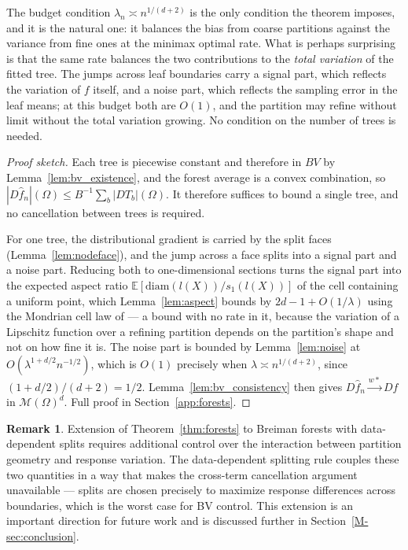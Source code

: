 \documentclass[12pt,a4paper]{article}
\numberwithin{equation}{section}
\theoremstyle{plain}
\theoremstyle{definition}
\newtheorem{remark}{Remark}
\newcommand{\E}{\mathbb{E}}
\newcommand{\cM}{\mathcal{M}(\Omega)^d}
\newcommand{\fn}{\hat{f}_n}
\begin{document}
	The budget condition $\lambda_n \asymp n^{1/(d+2)}$ is the only condition the
	theorem imposes, and it is the natural one: it balances the bias from coarse
	partitions against the variance from fine ones at the minimax optimal rate.
	What is perhaps surprising is that the same rate balances the two
	contributions to the \emph{total variation} of the fitted tree. The jumps
	across leaf boundaries carry a signal part, which reflects the variation of
	$f$ itself, and a noise part, which reflects the sampling error in the leaf
	means; at this budget both are $O(1)$, and the partition may refine without
	limit without the total variation growing. No condition on the number of
	trees is needed.
	
	\begin{proof}[Proof sketch]
		Each tree is piecewise constant and therefore in $BV$ by
		Lemma~\ref{lem:bv_existence}, and the forest average is a convex
		combination, so $|D\fn|(\Omega) \leq B^{-1}\sum_b |DT_b|(\Omega)$. It
		therefore suffices to bound a single tree, and no cancellation between
		trees is required.

		For one tree, the distributional gradient is carried by the split faces
		(Lemma~\ref{lem:nodeface}), and the jump across a face splits into a
		signal part and a noise part. Reducing both to one-dimensional sections
		turns the signal part into the expected aspect ratio
		$\E[\mathrm{diam}(l(X))/s_1(l(X))]$ of the cell containing a uniform
		point, which Lemma~\ref{lem:aspect} bounds by $2d-1+O(1/\lambda)$ using
		the Mondrian cell law of \citet{mourtada2017mondrian} --- a bound with no
		rate in it, because the variation of a Lipschitz function over a refining
		partition depends on the partition's shape and not on how fine it is. The
		noise part is bounded by Lemma~\ref{lem:noise} at
		$O(\lambda^{1+d/2}n^{-1/2})$, which is $O(1)$ precisely when
		$\lambda \asymp n^{1/(d+2)}$, since $(1+d/2)/(d+2) = 1/2$.
		Lemma~\ref{lem:bv_consistency} then gives $D\fn \xrightarrow{w*} Df$ in
		$\cM$. Full proof in Section~\ref{app:forests}.
	\end{proof}
	
	\begin{remark}
		Extension of Theorem~\ref{thm:forests} to Breiman forests with data-dependent splits
		requires additional control over the interaction between partition geometry and
		response variation. The data-dependent splitting rule couples these two quantities in
		a way that makes the cross-term cancellation argument unavailable --- splits are
		chosen precisely to maximize response differences across boundaries, which is the
		worst case for BV control. This extension is an important direction for future work
		and is discussed further in Section~\ref{M-sec:conclusion}.
	\end{remark}
	
\end{document}

